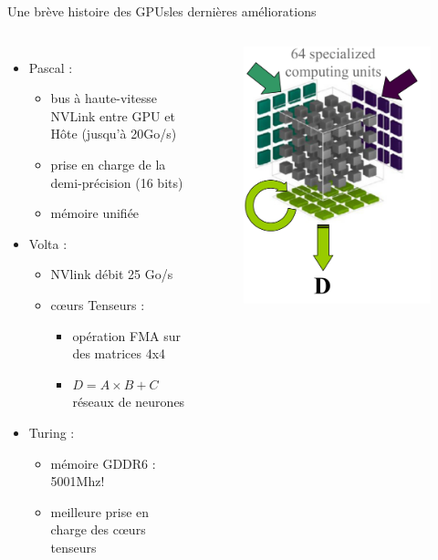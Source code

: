 \documentclass[11pt,mathserif]{beamer}
\newcommand{\gezi}{\faLongArrowRight}
\begin{document}
\begin{frame}{Une brève histoire des GPUs}{les dernières améliorations}
  \begin{columns}[t]
    \column{7cm}
    \begin{itemize}[<+->]
      \item Pascal :
        \begin{itemize}
          \item bus à haute-vitesse NVLink entre GPU et Hôte (jusqu'à 20Go/s)
          \item prise en charge de la demi-précision (16 bits)
          \item mémoire unifiée
         \end{itemize}
       \item Volta : 
        \begin{itemize}
          \item NVlink débit 25 Go/s
          \item cœurs Tenseurs : 
        \begin{itemize}
          \item opération FMA sur des matrices 4x4
          \item $D = A \times B + C$ \gezi réseaux de neurones
         \end{itemize}
        \end{itemize}
       \item Turing :
         \begin{itemize}
          \item mémoire GDDR6 : 5001Mhz!
          \item meilleure prise en charge des cœurs tenseurs
         \end{itemize}
    \end{itemize} 
\pause
    \column{4cm}
    \begin{figure}[htbp]
  \includegraphics[width=0.7\linewidth]{fig/tensorCore.png}

\end{figure}
\end{columns}
\end{frame}
\end{document}
